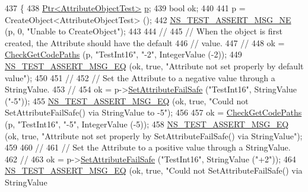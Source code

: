 \begin{DoxyCode}
437 \{
438   \hyperlink{classns3_1_1Ptr}{Ptr<AttributeObjectTest>} \hyperlink{lte__link__budget_8m_ac9de518908a968428863f829398a4e62}{p};
439   \textcolor{keywordtype}{bool} ok;
440 
441   p = CreateObject<AttributeObjectTest> ();
442   \hyperlink{group__testing_ga73d66fb0050a5111453fd144e767b91a}{NS\_TEST\_ASSERT\_MSG\_NE} (p, 0, \textcolor{stringliteral}{"Unable to CreateObject"});
443 
444   \textcolor{comment}{//}
445   \textcolor{comment}{// When the object is first created, the Attribute should have the default }
446   \textcolor{comment}{// value.}
447   \textcolor{comment}{//}
448   ok = \hyperlink{classAttributeTestCase_a902fb84c803f1c898329f9263575331e}{CheckGetCodePaths} (p, \textcolor{stringliteral}{"TestInt16"}, \textcolor{stringliteral}{"-2"}, IntegerValue (-2));
449   \hyperlink{group__testing_ga2a9d78cffb3db8e867c35fff0b698cf5}{NS\_TEST\_ASSERT\_MSG\_EQ} (ok, \textcolor{keyword}{true}, \textcolor{stringliteral}{"Attribute not set properly by default value"});
450 
451   \textcolor{comment}{//}
452   \textcolor{comment}{// Set the Attribute to a negative value through a StringValue.}
453   \textcolor{comment}{//}
454   ok = p->\hyperlink{classns3_1_1ObjectBase_aa7d333004e970f925a4ed5df275541b5}{SetAttributeFailSafe} (\textcolor{stringliteral}{"TestInt16"}, StringValue (\textcolor{stringliteral}{"-5"}));
455   \hyperlink{group__testing_ga2a9d78cffb3db8e867c35fff0b698cf5}{NS\_TEST\_ASSERT\_MSG\_EQ} (ok, \textcolor{keyword}{true}, \textcolor{stringliteral}{"Could not SetAttributeFailSafe() via StringValue
       to -5"});
456 
457   ok = \hyperlink{classAttributeTestCase_a902fb84c803f1c898329f9263575331e}{CheckGetCodePaths} (p, \textcolor{stringliteral}{"TestInt16"}, \textcolor{stringliteral}{"-5"}, IntegerValue (-5));
458   \hyperlink{group__testing_ga2a9d78cffb3db8e867c35fff0b698cf5}{NS\_TEST\_ASSERT\_MSG\_EQ} (ok, \textcolor{keyword}{true}, \textcolor{stringliteral}{"Attribute not set properly by
       SetAttributeFailSafe() via StringValue"});
459 
460   \textcolor{comment}{//}
461   \textcolor{comment}{// Set the Attribute to a positive value through a StringValue.}
462   \textcolor{comment}{//}
463   ok = p->\hyperlink{classns3_1_1ObjectBase_aa7d333004e970f925a4ed5df275541b5}{SetAttributeFailSafe} (\textcolor{stringliteral}{"TestInt16"}, StringValue (\textcolor{stringliteral}{"+2"}));
464   \hyperlink{group__testing_ga2a9d78cffb3db8e867c35fff0b698cf5}{NS\_TEST\_ASSERT\_MSG\_EQ} (ok, \textcolor{keyword}{true}, \textcolor{stringliteral}{"Could not SetAttributeFailSafe() via StringValue
}
\end{DoxyCode}

